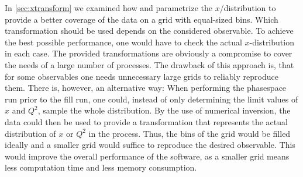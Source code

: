 In \cref{sec:xtransform} we examined how \appl{} and \fnlo{} parametrize the $x$\-/distribution to provide a better coverage of the data on a grid with equal-sized bins.
Which transformation should be used depends on the considered observable.
To achieve the best possible performance, one would have to check the actual $x$-distribution in each case.
The provided transformations are obviously a compromise to cover the needs of a large number of processes.
The drawback of this approach is, that for some observables one needs unnecessary large grids to reliably reproduce them.
There is, however, an alternative way: When performing the phasespace run prior to the fill run, one could, instead of only determining the limit values of $x$ and $Q^2$, sample the whole distribution.
By the use of numerical inversion, the data could then be used to provide a transformation that represents the actual distribution of $x$ or $Q^2$ in the process.
Thus, the bins of the grid would be filled ideally and a smaller grid would suffice to reproduce the desired observable.
This would improve the overall performance of the software, as a smaller grid means less computation time and less memory consumption.

